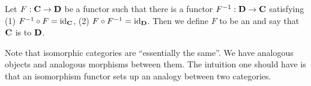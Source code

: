 \begin{defn}\label{defn:isomorphismFunctor}
Let $F:\mathbf{C}\to\mathbf{D}$ be a functor such that there is a functor
$F^{-1}:\mathbf{D}\to\mathbf{C}$ satisfying (1)
$F^{-1}\circ{}F=\operatorname{id}_{\mathbf{C}}$, (2)
$F\circ{}F^{-1}=\operatorname{id}_{\mathbf{D}}$. Then we define $F$ to be an
 and say that $\mathbf{C}$ is 
to $\mathbf{D}$.
\end{defn}

Note that isomorphic categories are ``essentially the same''. We
have analogous objects and analogous morphisms between them. The
intuition one should have is that an isomorphism functor sets up
an analogy between two categories.

